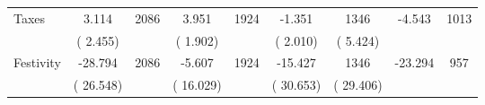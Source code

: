 \begin{tabular}{l*{8}{c}}
Taxes        &              3.114      &       2086       &              3.951      &       1924       &             -1.351      &       1346  &       -4.543 &       1013       \\
                       &       (       2.455)            &                               &       (       1.902)            &                               &       (       2.010)            &       (       5.424) &                  \\
Festivity        &            -28.794      &       2086       &             -5.607      &       1924       &            -15.427      &       1346  &      -23.294 &       957       \\
                       &       (      26.548)            &                               &       (      16.029)            &                               &       (      30.653)            &       (      29.406) &                  \\
\hline \end{tabular}